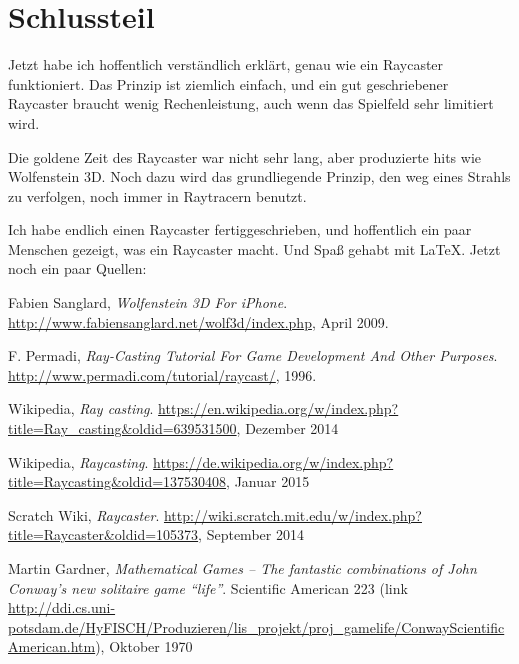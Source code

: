 \documentclass[a4paper,12pt]{report}
\newcommand{\mychapter}[2]{
    \setcounter{chapter}{#1}
    \setcounter{section}{0}
    \chapter*{#2}
    \addcontentsline{toc}{chapter}{#2}
}
\begin{document}
\begingroup
\renewcommand{\cleardoublepage}{}
\renewcommand{\clearpage}{}

\mychapter{3}{Schlussteil}
Jetzt habe ich hoffentlich verständlich erklärt, genau wie ein Raycaster funktioniert. Das Prinzip ist ziemlich einfach, und ein gut geschriebener Raycaster braucht wenig Rechenleistung, auch wenn das Spielfeld sehr limitiert wird.

Die goldene Zeit des Raycaster war nicht sehr lang, aber produzierte hits wie Wolfenstein 3D. Noch dazu wird das grundliegende Prinzip, den weg eines Strahls zu verfolgen, noch immer in Raytracern benutzt.

Ich habe endlich einen Raycaster fertiggeschrieben, und hoffentlich ein paar Menschen gezeigt, was ein Raycaster macht. Und Spaß gehabt mit \LaTeX. Jetzt noch ein paar Quellen:
\endgroup

\begin{thebibliography}{9}

  Fabien Sanglard,
  \emph{Wolfenstein 3D For iPhone}.
  \url{http://www.fabiensanglard.net/wolf3d/index.php},
  April 2009.

  F. Permadi,
  \emph{Ray-Casting Tutorial For Game Development And Other Purposes}.
  \url{http://www.permadi.com/tutorial/raycast/},
  1996.

  Wikipedia,
  \emph{Ray casting}.
  \url{https://en.wikipedia.org/w/index.php?title=Ray_casting&oldid=639531500},
  Dezember 2014

  Wikipedia,
  \emph{Raycasting}.
  \url{https://de.wikipedia.org/w/index.php?title=Raycasting&oldid=137530408},
  Januar 2015

  Scratch Wiki,
  \emph{Raycaster}.
  \url{http://wiki.scratch.mit.edu/w/index.php?title=Raycaster&oldid=105373},
  September 2014
  
  Martin Gardner,
  \emph{ Mathematical Games – The fantastic combinations of John Conway's new solitaire game ``life''}.
  Scientific American 223 (link \url{http://ddi.cs.uni-potsdam.de/HyFISCH/Produzieren/lis_projekt/proj_gamelife/ConwayScientificAmerican.htm}),
  Oktober 1970

\end{thebibliography}
\end{document}
